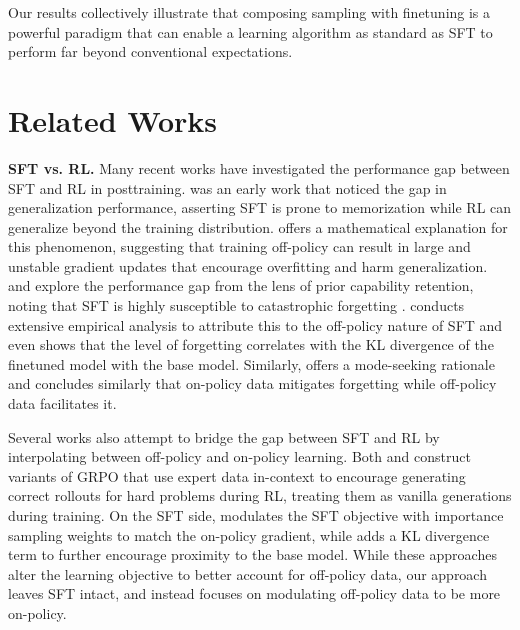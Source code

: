 \documentclass{article}
\begin{document}
Our results collectively illustrate that composing sampling with finetuning is a powerful paradigm that can enable a learning algorithm as standard as SFT to perform far beyond conventional expectations.



\section{Related Works}
\label{rel_works}

\textbf{SFT vs. RL.} Many recent works have investigated the performance gap between SFT and RL in posttraining. \cite{chu2025sftmemorizesrlgeneralizes} was an early work that noticed the gap in generalization performance, asserting SFT is prone to memorization while RL can generalize beyond the training distribution. \cite{xiong2025minimalist} offers a mathematical explanation for this phenomenon, suggesting that training off-policy can result in large and unstable gradient updates that encourage overfitting and harm generalization. \cite{shenfeld2025rl} and \cite{chen2025retaining} explore the performance gap from the lens of prior capability retention, noting that SFT is highly susceptible to catastrophic forgetting \citep{kirkpatrick2017overcoming, luo2023empirical}. \cite{shenfeld2025rl} conducts extensive empirical analysis to attribute this to the off-policy nature of SFT  and even shows that the level of forgetting correlates with the KL divergence of the finetuned model with the base model. Similarly, \cite{chen2025retaining} offers a mode-seeking rationale and concludes similarly that on-policy data mitigates forgetting while off-policy data facilitates it.

Several works also attempt to bridge the gap between SFT and RL by interpolating between off-policy and on-policy learning. Both \cite{liu2025uft} and \cite{qu2026pope} construct variants of GRPO \citep{guo2025deepseekr1} that use expert data in-context to encourage generating correct rollouts for hard problems during RL, treating them as vanilla generations during training. On the SFT side, \cite{wu2025generalization} modulates the SFT objective with importance sampling weights to match the on-policy gradient, while \cite{zhu2025anchored} adds a KL divergence term to further encourage proximity to the base model. While these approaches alter the learning objective to better account for off-policy data, our approach leaves SFT intact, and instead focuses on modulating off-policy data to be more on-policy.
\end{document}
